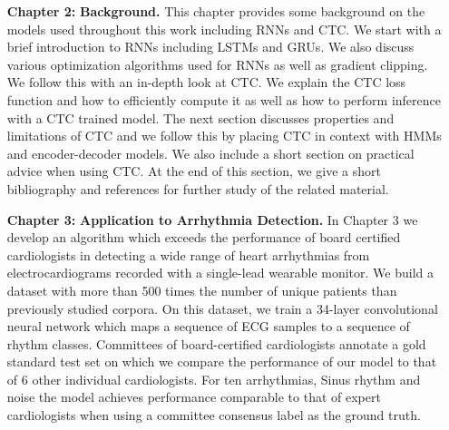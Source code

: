\begin{itemize}
    \setlength{\itemindent}{3.4em}
    \item[{\bf Chapter 2:}]{\bf Background.} This chapter provides some
        background on the models used throughout this work including RNNs and
        CTC. We start with a brief introduction to RNNs including LSTMs and
        GRUs. We also discuss various optimization algorithms used for RNNs as
        well as gradient clipping. We follow this with an in-depth look at CTC.
        We explain the CTC loss function and how to efficiently compute it as
        well as how to perform inference with a CTC trained model. The next
        section discusses properties and limitations of CTC and we follow this
        by placing CTC in context with HMMs and encoder-decoder models. We also
        include a short section on practical advice when using CTC. At the end
        of this section, we give a short bibliography and references for
        further study of the related material.

    \item [{\bf Chapter 3:}]{\bf Application to Arrhythmia Detection.} In
        Chapter 3 we develop an algorithm which exceeds the performance of
        board certified cardiologists in detecting a wide range of heart
        arrhythmias from electrocardiograms recorded with a single-lead
        wearable monitor. We build a dataset with more than 500 times the
        number of unique patients than previously studied corpora. On this
        dataset, we train a 34-layer convolutional neural network which maps a
        sequence of ECG samples to a sequence of rhythm classes. Committees of
        board-certified cardiologists annotate a gold standard test set on
        which we compare the performance of our model to that of 6 other
        individual cardiologists. For ten arrhythmias, Sinus rhythm and noise
        the model achieves performance comparable to that of expert
        cardiologists when using a committee consensus label as the ground
        truth.


\end{itemize}
